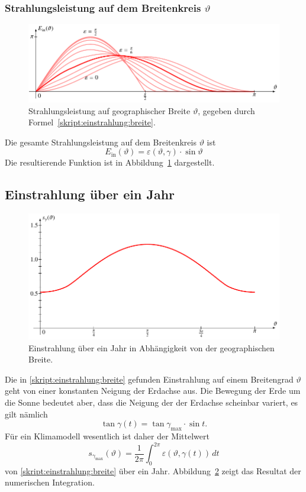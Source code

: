 \subsubsection{Strahlungsleistung auf dem Breitenkreis $\vartheta$}
\begin{figure}
\centering
\includegraphics[width=\hsize]{chapters/5/ein1.pdf}
\caption{Strahlungsleistung auf geographischer Breite $\vartheta$,
gegeben durch Formel~\eqref{skript:einstrahlung:breite}.
\label{skript:einstrahlung:ein1}}
\end{figure}%
Die gesamte Strahlungsleistung auf dem Breitenkreis $\vartheta$
ist
\begin{equation}
E_{\text{in}}(\vartheta)
=
\varepsilon(\vartheta,\gamma)
\cdot
\sin\vartheta
\label{skript:einstrahlung:breite}
\end{equation}
Die resultierende Funktion ist in Abbildung~\ref{skript:einstrahlung:ein1}
dargestellt.

\subsection{Einstrahlung über ein Jahr}
\begin{figure}
\centering
\includegraphics[width=\hsize]{chapters/5/total.pdf}
\caption{Einstrahlung über ein Jahr in Abhängigkeit von der geographischen
Breite.
\label{skript:einstrahlung:total}}
\end{figure}
Die in \eqref{skript:einstrahlung:breite} gefunden Einstrahlung auf einem
Breitengrad $\vartheta$ geht von einer konstanten Neigung der Erdachse aus.
Die Bewegung der Erde um die Sonne bedeutet aber, dass die Neigung der
der Erdachse scheinbar variert,
es gilt nämlich
\[
\tan \gamma(t) = \tan\gamma_\text{max}\cdot \sin t.
\]
Für ein Klimamodell wesentlich ist daher der Mittelwert
\[
s_{\gamma_\text{max}}(\vartheta)
=
\frac1{2\pi}
\int_0^{2\pi} \varepsilon(\vartheta,\gamma(t))\,dt
\]
von \eqref{skript:einstrahlung:breite} über ein Jahr.
Abbildung~\ref{skript:einstrahlung:total} zeigt das Resultat der 
numerischen Integration.








